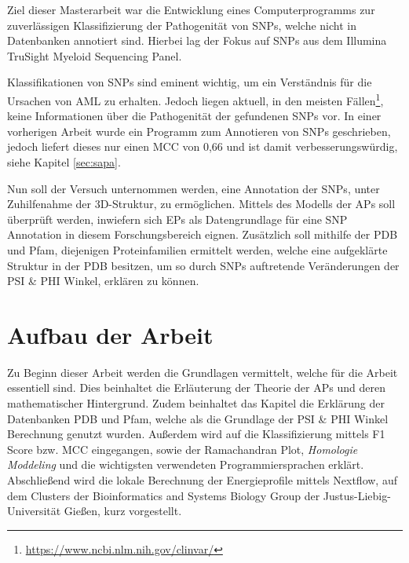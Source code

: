 Ziel dieser Masterarbeit war die Entwicklung eines Computerprogramms zur zuverlässigen Klassifizierung der Pathogenität von SNPs, welche nicht in Datenbanken annotiert sind. Hierbei lag der Fokus auf \ac{SNP}s aus dem Illumina TruSight Myeloid Sequencing Panel.

Klassifikationen von \ac{SNP}s sind eminent wichtig, um ein Verständnis für die Ursachen von \ac{AML} zu erhalten. Jedoch liegen aktuell, in den meisten Fällen\footnote{\url{https://www.ncbi.nlm.nih.gov/clinvar/}}, keine Informationen über die Pathogenität der gefundenen \ac{SNP}s vor. In einer vorherigen Arbeit wurde ein Programm zum Annotieren von \ac{SNP}s geschrieben, jedoch liefert dieses nur einen \ac{MCC} von 0,66 und ist damit verbesserungswürdig, siehe Kapitel \ref{sec:sapa}.

Nun soll der Versuch unternommen werden, eine Annotation der \ac{SNP}s, unter Zuhilfenahme der 3D-Struktur, zu ermöglichen. Mittels des Modells der \ac{APs} soll überprüft werden, inwiefern sich \ac{EP}s als Datengrundlage für eine \ac{SNP} Annotation in diesem Forschungsbereich eignen. Zusätzlich soll mithilfe der \ac{PDB} und \ac{Pfam}, diejenigen Proteinfamilien ermittelt werden, welche eine aufgeklärte Struktur in der \ac{PDB} besitzen, um so durch \ac{SNP}s auftretende Veränderungen der PSI \& PHI Winkel, erklären zu können. 



\section{Aufbau der Arbeit}

Zu Beginn dieser Arbeit werden die Grundlagen vermittelt, welche für die Arbeit essentiell sind. Dies beinhaltet die Erläuterung der Theorie der \ac{APs} und deren mathematischer Hintergrund. Zudem beinhaltet das Kapitel die Erklärung der Datenbanken \ac{PDB} und \ac{Pfam}, welche als die Grundlage der PSI \& PHI Winkel Berechnung genutzt wurden. 
Außerdem wird auf die Klassifizierung mittels F1 Score bzw. \ac{MCC} eingegangen, sowie der Ramachandran Plot, \emph{Homologie Moddeling} und die wichtigsten verwendeten Programmiersprachen
erklärt. Abschließend wird die lokale Berechnung der Energieprofile mittels Nextflow, auf dem Clusters der Bioinformatics and Systems Biology Group der Justus-Liebig-Universität Gießen, kurz vorgestellt.

